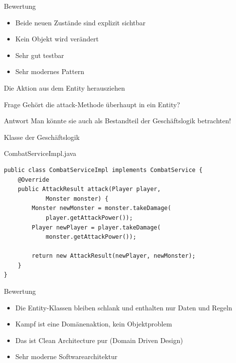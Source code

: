 \begin{frame}{Bewertung}
	\begin{itemize}
	  \item Beide neuen Zustände sind explizit sichtbar
	  \item Kein Objekt wird verändert
	  \item Sehr gut testbar
	  \item Sehr modernes Pattern
	\end{itemize}	
\end{frame}

\begin{frame}{Die Aktion aus dem Entity herausziehen}
	\begin{alertblock}{Frage}
		Gehört die attack-Methode überhaupt in ein Entity?	
	\end{alertblock}
	\pause
	
	\begin{exampleblock}{Antwort}
		Man könnte sie auch als Bestandteil der Geschäftslogik betrachten!
	\end{exampleblock}
\end{frame}

\begin{frame}[fragile]{Klasse der Geschäftslogik}
	\begin{exampleblock}{CombatServiceImpl.java}
		\begin{lstlisting}
public class CombatServiceImpl implements CombatService {
	@Override
    public AttackResult attack(Player player, 
    		Monster monster) {
        Monster newMonster = monster.takeDamage(
        	player.getAttackPower());
        Player newPlayer = player.takeDamage(
        	monster.getAttackPower());

        return new AttackResult(newPlayer, newMonster);
    }
}
		\end{lstlisting}
	\end{exampleblock}
\end{frame}

\begin{frame}{Bewertung}
	\begin{itemize}
	  \item Die Entity-Klassen bleiben schlank und enthalten nur Daten und Regeln
	  \item Kampf ist eine Domänenaktion, kein Objektproblem
	  \item Das ist Clean Architecture pur (Domain Driven Design)
	  \item Sehr moderne Softwarearchitektur
	\end{itemize}	
\end{frame}